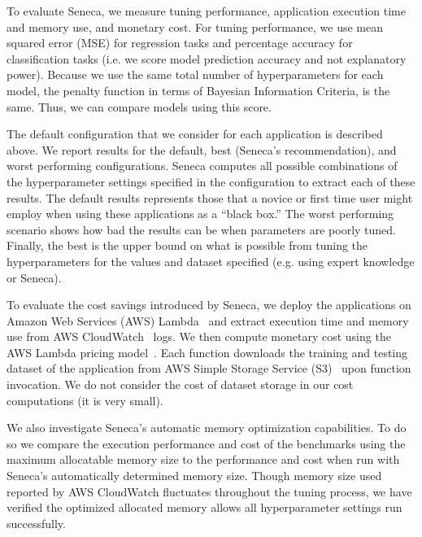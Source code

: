 To evaluate Seneca, we measure tuning performance, application execution time and memory use,
and monetary cost.  For tuning performance, we use mean squared error (MSE)
for regression tasks and percentage accuracy for classification tasks (i.e. we score
model prediction accuracy and not explanatory power).  Because we use the same 
total number of hyperparameters for each model, the penalty function in terms of 
Bayesian Information Criteria, is the same. Thus, we can compare models using
this score.

The default configuration that we consider for each application is described
above.  We report results for the default, best (Seneca's recommendation), and
worst performing configurations.  Seneca computes all possible combinations of
the hyperparameter settings specified in the configuration to extract each of
these results.  The default results represents those that a novice or first
time user might employ when using these applications as a ``black box.''  The
worst performing scenario shows how bad the results can be when parameters are
poorly tuned.  Finally, the best is the upper bound on what is possible from
tuning the hyperparameters for the values and dataset specified 
(e.g. using expert knowledge or Seneca). 

To evaluate the cost savings introduced by Seneca, we deploy the applications
on Amazon Web Services (AWS) Lambda~\cite{ref:awslambda} and extract
execution time and memory use from AWS CloudWatch~\cite{ref:awscloudwatch} logs.  
We then compute monetary cost
using the AWS Lambda pricing model~\cite{ref:pricing}.
Each function downloads the training and testing dataset 
of the application from AWS Simple Storage Service (S3)~\cite{ref:awss3} upon function invocation. 
We do not consider the cost of dataset storage in our cost computations (it is very small).

We also investigate Seneca's automatic memory optimization capabilities.  To
do so we compare the execution performance and cost of the benchmarks using
the maximum allocatable memory size to the performance and cost when run with
Seneca's automatically determined memory size. Though memory size used reported by AWS CloudWatch fluctuates throughout the tuning process, we have verified the optimized allocated memory allows all hyperparameter settings run successfully.



